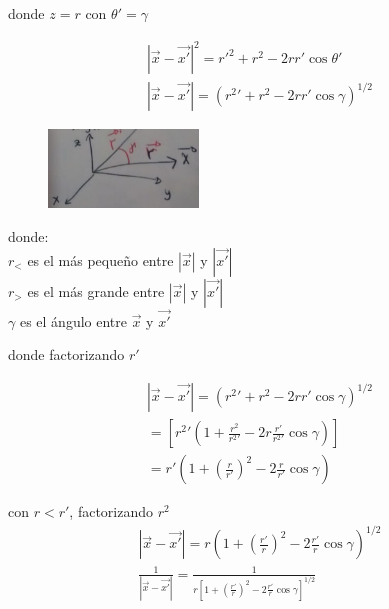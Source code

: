 \documentclass{article}
\begin{document}
donde $z = r$ con  $\theta \prime = \gamma$

\begin{equation}
    \begin{gathered}
    |\vec{x}- \vec{x\prime}|^2 = r\prime ^2 + r^2 - 2r r\prime \cos \theta \prime \\
    |\vec{x} - \vec{x\prime}| = (r^2\prime + r^2 - 2 r r\prime \cos \gamma)^{1/2}
    \end{gathered}
\end{equation}


\begin{figure}[h]
\includegraphics[width=4cm]{image2}
\centering
\end{figure}

donde: \\
$r_<$ es el más pequeño entre $|\vec{x}|$ y $|\vec{x\prime}|$ \\
$r_>$ es el más grande entre $|\vec{x}|$ y $|\vec{x\prime}|$ \\
$\gamma$ es el ángulo entre $\vec{x}$ y $\vec{x\prime}$

donde factorizando $r\prime$

\begin{equation}
    \begin{gathered}
    |\vec{x} - \vec{x\prime}| = (r^2\prime + r^2 - 2 r r\prime \cos \gamma)^{1/2} \\
    = \left [ r^2\prime \left( 1 + \frac{r^2}{r^2\prime} - 2 r \frac{ r \prime }{r^{2}\prime} \cos \gamma \right) \right] \\
    = r\prime \left (1 + \left (\frac{r}{r\prime}\right )^2 - 2 \frac{r}{r\prime}\cos\gamma \right)
\end{gathered}
\end{equation}

con $r < r\prime$, factorizando $r^2$
\begin{equation}
    \begin{gathered}
    |\vec{x} - \vec{x\prime}| = r \left ( 1 + \left (\frac{r\prime}{r} \right )^2 - 2 \frac{r\prime}{r}\cos \gamma \right )^{1/2} \\
    \frac{1}{|\vec{x} - \vec{x\prime}|} = \frac{1}{ r \left [ 1 + \left (\frac{r\prime}{r} \right )^2 - 2 \frac{r\prime}{r}\cos \gamma \right ]^{1/2}  }
    \end{gathered}
\end{equation}
\end{document}
